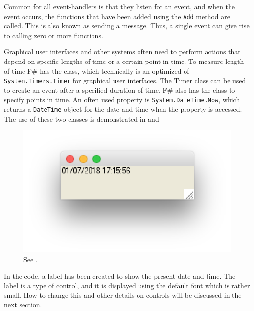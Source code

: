 \documentclass[fsharpNotes.tex]{subfiles}
\begin{document}
Common for all event-handlers is that they listen for an event, and when the event occurs, the functions that have been added using the \lstinline{Add} method are called. This is also known as sending a message. Thus, a single event can give rise to calling zero or more functions.

Graphical user interfaces and other systems often need to perform actions that depend on specific lengths of time or a certain point in time. To measure length of time F\# has the  class, which technically is an optimized of \lstinline{System.Timers.Timer} for graphical user interfaces. The Timer class can be used to create an event after a specified duration of time. F\# also has the  class to specify points in time. An often used property is \lstinline{System.DateTime.Now}, which returns a \lstinline{DateTime} object for the date and time when the property is accessed. The use of these two classes is demonstrated in  and .
%
%
\begin{figure}
  \centering
  \includegraphics[scale=0.3]{clock}
  \caption{See .}
  \label{fig:clock}
\end{figure}
In the code, a label has been created to show the present date and time. The label is a type of control, and it is displayed using the default font which is rather small. How to change this and other details on controls will be discussed in the next section.
\end{document}
